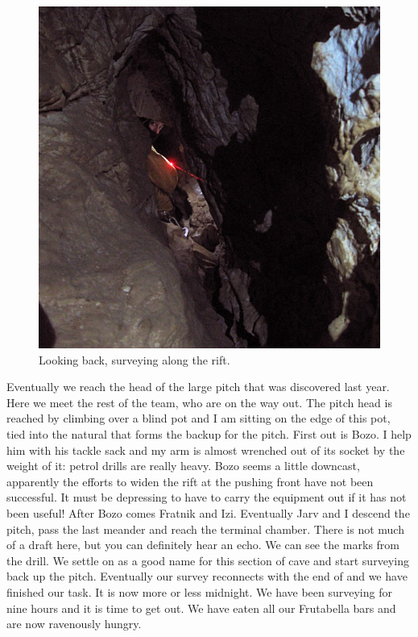 \begin{figure}
\checkoddpage \ifoddpage \forcerectofloat \else \forceversofloat \fi
   \centering
\includegraphics[width = \textwidth]{2011/super_action/Jarvist M Frost - Canon A520 - M2 Super Action - 2011-10-22-19.01.40-IMG_0215_square_crop_balanced--orig.jpg}
\caption{Looking back, surveying along the rift. } \label{M2 survey 2}
\end{figure}

Eventually we reach the head of the large pitch that was discovered last
year. Here we meet the rest of the team, who are on the way out. The
pitch head is reached by climbing over a blind pot and I am sitting on
the edge of this pot, tied into the natural that forms the backup for
the pitch. First out is Bozo. I help him with his tackle sack and my arm
is almost wrenched out of its socket by the weight of it: petrol drills
are really heavy. Bozo seems a little downcast, apparently the efforts
to widen the rift at the pushing front have not been successful. It must
be depressing to have to carry the equipment out if it has not been
useful! After Bozo comes Fratnik and Izi. Eventually Jarv and I descend
the pitch, pass the last meander and reach the terminal chamber. There
is not much of a draft here, but you can definitely hear an echo. We can
see the marks from the drill. We settle on  as a good
name for this section of cave and start surveying back up the pitch.
Eventually our survey reconnects with the end of  and we
have finished our task. It is now more or less midnight. We have been
surveying for nine hours and it is time to get out. We have eaten all
our Frutabella bars and are now ravenously hungry.

